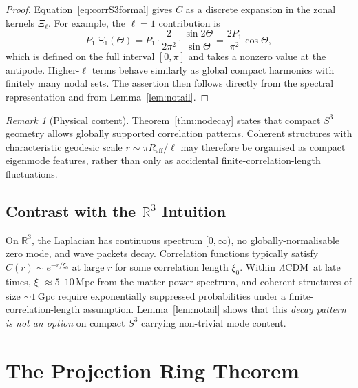 \documentclass[
  aps,
  prd,
  reprint,
  superscriptaddress,
  nofootinbib,
  longbibliography,
  floatfix,
  amsmath,
  amssymb
]{revtex4-2}
\theoremstyle{plain}
\theoremstyle{definition}
\theoremstyle{remark}
\newtheorem{remark}[theorem]{Remark}
\newcommand{\LCDM}{\ensuremath{\Lambda}CDM}
\newcommand{\Sthree}{S^3}
\newcommand{\Reff}{R_{\mathrm{eff}}}
\begin{document}
\begin{proof}
  Equation~\eqref{eq:corrS3formal} gives $C$ as a discrete expansion in
  the zonal kernels $\Xi_\ell$. For example, the $\ell=1$ contribution is
  \begin{equation}
    P_1\,\Xi_1(\Theta)
    = P_1\cdot\frac{2}{2\pi^2}\cdot\frac{\sin 2\Theta}{\sin\Theta}
    = \frac{2P_1}{\pi^2}\cos\Theta,
    \label{eq:ell1}
  \end{equation}
  which is defined on the full interval $[0,\pi]$ and takes a nonzero
  value at the antipode. Higher-$\ell$ terms behave similarly as global
  compact harmonics with finitely many nodal sets. The assertion then
  follows directly from the spectral representation and from
  Lemma~\ref{lem:notail}.
\end{proof}

\begin{remark}[Physical content]
  Theorem~\ref{thm:nodecay} states that compact $\Sthree$ geometry allows
  globally supported correlation patterns. Coherent structures with
  characteristic geodesic scale $r\sim\pi\Reff/\ell$ may therefore be
  organised as compact eigenmode features, rather than only as accidental
  finite-correlation-length fluctuations.
\end{remark}

\subsection{Contrast with the $\mathbb{R}^3$ Intuition}

On $\mathbb{R}^3$, the Laplacian has continuous spectrum $[0,\infty)$,
no globally-normalisable zero mode, and wave packets decay. Correlation
functions typically satisfy $C(r)\sim e^{-r/\xi_0}$ at large $r$ for
some correlation length $\xi_0$. Within \LCDM\ at late times,
$\xi_0\approx 5$--$10\,\mathrm{Mpc}$ from the matter power spectrum,
and coherent structures of size $\sim 1\,\mathrm{Gpc}$ require
exponentially suppressed probabilities under a finite-correlation-length
assumption. Lemma~\ref{lem:notail} shows that this \emph{decay pattern
is not an option} on compact $\Sthree$ carrying non-trivial mode content.

\section{The Projection Ring Theorem}
\label{sec:projection}
\end{document}
